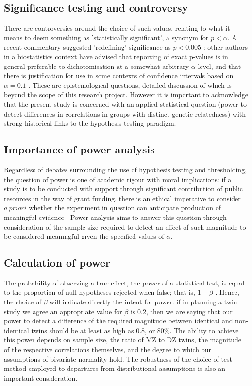 \subsection{Significance testing and controversy}
There are controversies around the choice of such values, relating to what it means to deem something as 'statistically significant', a synonym for $p < \alpha$. A recent commentary suggested 'redefining' significance as $p < 0.005$ \cite{Benjamin2018}; other authors in a biostatistics context have advised that reporting of exact p-values is in general preferable to dichotomisation at a somewhat arbitrary $\alpha$ level, and that there is justification for use in some contexts of confidence intervals based on $\alpha=0.1$ \cite{Clayton1993}.  These are epistemological questions, detailed discussion of which is beyond the scope of this research project.  However it is important to acknowledge that the present study is concerned with an applied statistical question (power to detect differences in correlations in groups with distinct genetic relatedness) with strong historical links to the hypothesis testing paradigm.  
\subsection{Importance of power analysis}
Regardless of debates surrounding the use of hypothesis testing and thresholding, the question of power is one of academic rigour with moral implications: if a study is to be conducted with support through significant contribution of public resources in the way of grant funding, there is an ethical imperative to consider $a \ priori$ whether the experiment in question can anticipate production of meaningful evidence \cite{Freiman1978,Cohen1988}.  Power analysis aims to answer this question through consideration of the sample size required to detect an effect of such magnitude to be considered meaningful given the specified values of $\alpha$.  
\subsection{Calculation of power}
The probability of observing a true effect, the power of a statistical test, is equal to the proportion of null hypotheses rejected when false; that is, $1 - \beta$ \cite{Cohen1988}.  Hence, the choice of $\beta$ will indicate directly the intent for power: if in planning a twin study we agree an appropriate value for $\beta$ is 0.2, then we are saying that our power to detect a difference of the required magnitude between identical and non-identical twins should be at least as high as 0.8, or 80\%. The ability to achieve this power depends on sample size, the ratio of MZ to DZ twins, the magnitude of the respective correlations themselves, and the degree to which our assumptions of bivariate normality hold. The robustness of the choice of test method employed to departures from distributional assumptions is also an important consideration.


